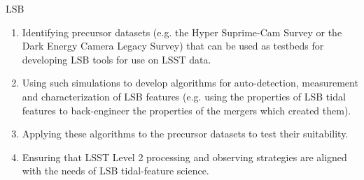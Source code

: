 {\begin{tasklist}{LSB}
\begin{task}
{\begin{enumerate}
\item Identifying precursor datasets (e.g. the Hyper Suprime-Cam Survey or the Dark Energy Camera Legacy Survey) that can be used as testbeds for developing LSB tools for use on LSST data.
\item Using  such  simulations   to  develop algorithms for auto-detection, measurement and characterization of LSB features (e.g. using the properties of LSB tidal features to back-engineer the properties of the mergers which created them).
\item Applying these algorithms to the precursor datasets to test their suitability.
\item Ensuring  that LSST Level 2 processing  and observing  strategies are  aligned with the needs of LSB tidal-feature science.
\end{enumerate}
}
~\\
\end{task}



\end{tasklist}}
